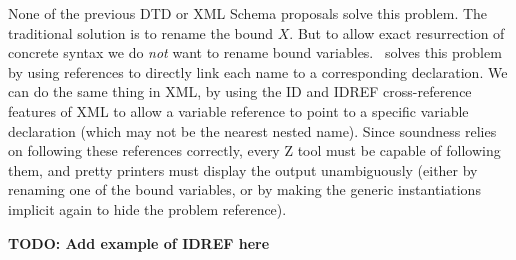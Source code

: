 \documentclass{llncs}  %
\newcommand{\TODO}[1]{\textbf{TODO: #1}}   %
\begin{document}

None of the previous DTD or XML Schema proposals solve this problem.
The traditional solution is to rename the bound $X$.  But
to allow exact resurrection of concrete syntax we do \emph{not} want to
rename bound variables.  \CADiZ\ solves this problem by using references
to directly link each name to a corresponding declaration.
We can do the same thing in XML, by using the ID and IDREF
cross-reference features of XML to allow a variable reference to point to
a specific variable declaration (which may not be the nearest nested
name).  Since soundness relies on following these references correctly,
every Z tool must be capable of following them, and pretty printers must
display the output unambiguously (either by renaming one of the bound
variables, or by making the generic instantiations implicit again to hide
the problem reference).  

\TODO{Add example of IDREF here}

\end{document}
